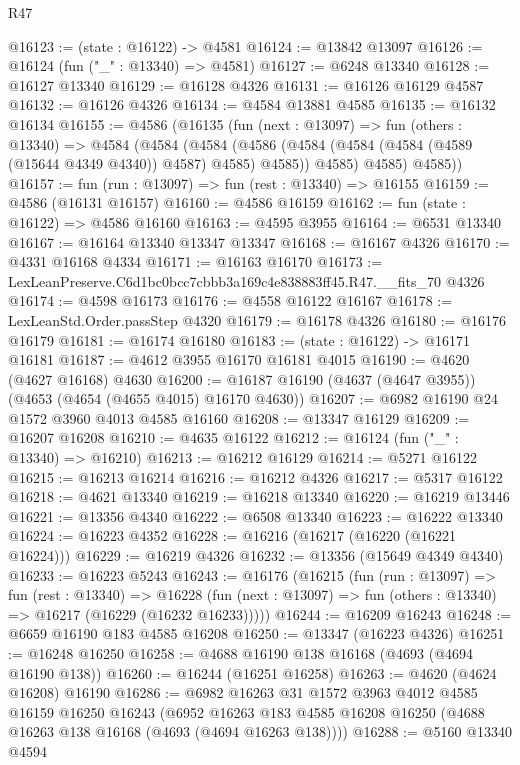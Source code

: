 \begin{lexlean}{R47}
\begin{coremodule}
@16123 := (state : @16122) -> @4581
@16124 := @13842 @13097
@16126 := @16124 (fun ("_" : @13340) => @4581)
@16127 := @6248 @13340
@16128 := @16127 @13340
@16129 := @16128 @4326
@16131 := @16126 @16129 @4587
@16132 := @16126 @4326
@16134 := @4584 @13881 @4585
@16135 := @16132 @16134
@16155 := @4586
    (@16135
      (fun (next : @13097) =>
      fun (others : @13340) =>
      @4584
        (@4584
          (@4584
            (@4586 (@4584 (@4584 (@4584 (@4589 (@15644 @4349 @4340)) @4587) @4585) @4585))
            @4585)
          @4585)
        @4585))
@16157 := fun (run : @13097) => fun (rest : @13340) => @16155
@16159 := @4586 (@16131 @16157)
@16160 := @4586 @16159
@16162 := fun (state : @16122) => @4586 @16160
@16163 := @4595 @3955
@16164 := @6531 @13340
@16167 := @16164 @13340 @13347 @13347
@16168 := @16167 @4326
@16170 := @4331 @16168 @4334
@16171 := @16163 @16170
@16173 := LexLeanPreserve.C6d1bc0bcc7cbbb3a169c4e838883ff45.R47.__fits_70 @4326
@16174 := @4598 @16173
@16176 := @4558 @16122 @16167
@16178 := LexLeanStd.Order.passStep @4320
@16179 := @16178 @4326
@16180 := @16176 @16179
@16181 := @16174 @16180
@16183 := (state : @16122) -> @16171 @16181
@16187 := @4612 @3955 @16170 @16181 @4015
@16190 := @4620 (@4627 @16168) @4630
@16200 := @16187 @16190 (@4637 (@4647 @3955)) (@4653 (@4654 (@4655 @4015) @16170 @4630))
@16207 := @6982 @16190 @24 @1572 @3960 @4013 @4585 @16160
@16208 := @13347 @16129
@16209 := @16207 @16208
@16210 := @4635 @16122
@16212 := @16124 (fun ("_" : @13340) => @16210)
@16213 := @16212 @16129
@16214 := @5271 @16122
@16215 := @16213 @16214
@16216 := @16212 @4326
@16217 := @5317 @16122
@16218 := @4621 @13340
@16219 := @16218 @13340
@16220 := @16219 @13446
@16221 := @13356 @4340
@16222 := @6508 @13340
@16223 := @16222 @13340
@16224 := @16223 @4352
@16228 := @16216 (@16217 (@16220 (@16221 @16224)))
@16229 := @16219 @4326
@16232 := @13356 (@15649 @4349 @4340)
@16233 := @16223 @5243
@16243 := @16176
    (@16215
      (fun (run : @13097) =>
      fun (rest : @13340) =>
      @16228 (fun (next : @13097) => fun (others : @13340) => @16217 (@16229 (@16232 @16233)))))
@16244 := @16209 @16243
@16248 := @6659 @16190 @183 @4585 @16208
@16250 := @13347 (@16223 @4326)
@16251 := @16248 @16250
@16258 := @4688 @16190 @138 @16168 (@4693 (@4694 @16190 @138))
@16260 := @16244 (@16251 @16258)
@16263 := @4620 (@4624 @16208) @16190
@16286 := @6982
    @16263
    @31
    @1572
    @3963
    @4012
    @4585
    @16159
    @16250
    @16243
    (@6952 @16263 @183 @4585 @16208 @16250 (@4688 @16263 @138 @16168 (@4693 (@4694 @16263 @138))))
@16288 := @5160 @13340 @4594

\end{coremodule}
\end{lexlean}
